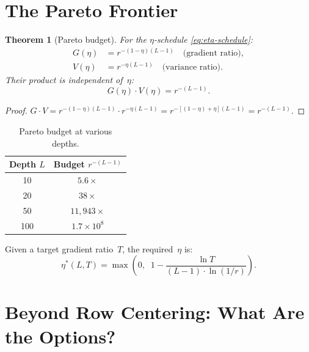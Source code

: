 \documentclass[11pt,a4paper]{article}
\newtheorem{theorem}{Theorem}[section]
\theoremstyle{definition}
\begin{document}
\section{The Pareto Frontier}
\label{sec:pareto}

\begin{theorem}[Pareto budget]
\label{thm:pareto}
For the $\eta$-schedule \eqref{eq:eta-schedule}:
\begin{align}
  G(\eta) &= r^{-(1-\eta)(L-1)} \quad\text{(gradient ratio)}, \\
  V(\eta) &= r^{-\eta(L-1)} \quad\text{(variance ratio)}.
\end{align}
Their product is independent of~$\eta$:
\begin{equation}\label{eq:pareto}
  \boxed{\;G(\eta) \cdot V(\eta) = r^{-(L-1)}.\;}
\end{equation}
\end{theorem}
\begin{proof}
  $G \cdot V = r^{-(1-\eta)(L-1)} \cdot r^{-\eta(L-1)}
             = r^{-[(1-\eta)+\eta](L-1)} = r^{-(L-1)}$.
\end{proof}

\begin{table}[H]
\centering
\caption{Pareto budget at various depths.}
\label{tab:budget}
\begin{tabular}{c c}
\toprule
Depth $L$ & Budget $r^{-(L-1)}$ \\
\midrule
10  & $5.6\times$ \\
20  & $38\times$ \\
50  & $11{,}943\times$ \\
100 & $1.7 \times 10^8$ \\
\bottomrule
\end{tabular}
\end{table}

Given a target gradient ratio~$T$, the required~$\eta$ is:
\begin{equation}\label{eq:eta-adaptive}
  \eta^{\ast}(L, T) = \max\!\left(0,\;\; 1 - \frac{\ln T}{(L-1) \cdot \ln(1/r)}\right).
\end{equation}


\section{Beyond Row Centering: What Are the Options?}
\label{sec:beyond}
\end{document}

